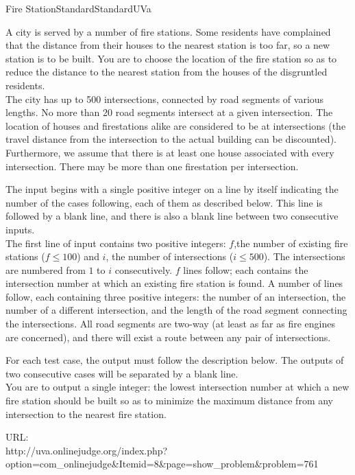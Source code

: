 \begin{problema}{Fire Station}{Standard}{Standard}{UVa} 

A city is served by a number of fire stations. Some residents have complained that the distance from their houses to the nearest station is too far, so a new station is to be built. You are to choose the location of the fire station so as to reduce the distance to the nearest station from the houses of the disgruntled residents.  \\

The city has up to 500 intersections, connected by road segments of various lengths. No more than 20 road segments intersect at a given intersection. The location of houses and firestations alike are considered to be at intersections (the travel distance from the intersection to the actual building can be discounted). Furthermore, we assume that there is at least one house associated with every intersection. There may be more than one firestation per intersection. \\



\InputFile

The input begins with a single positive integer on a line by itself indicating the number of the cases following, each of them as described below. This line is followed by a blank line, and there is also a blank line between two consecutive inputs.  \\


The first line of input contains two positive integers: $f$,the number of existing fire stations ($f \leq 100$) and $i$, the number of intersections ($i \leq 500$). The intersections are numbered from $1$ to $i$ consecutively. $f$ lines follow; each contains the intersection number at which an existing fire station is found. A number of lines follow, each containing three positive integers: the number of an intersection, the number of a different intersection, and the length of the road segment connecting the intersections. All road segments are two-way (at least as far as fire engines are concerned), and there will exist a route between any pair of intersections. 
 \\


\OutputFile

For each test case, the output must follow the description below. The outputs of two consecutive cases will be separated by a blank line.  \\


You are to output a single integer: the lowest intersection number at which a new fire station should be built so as to minimize the maximum distance from any intersection to the nearest fire station. \\



\Example




URL:\\ 
http://uva.onlinejudge.org/index.php? \\
option=com\_onlinejudge\&Itemid=8\&page=show\_problem\&problem=761


\end{problema}

